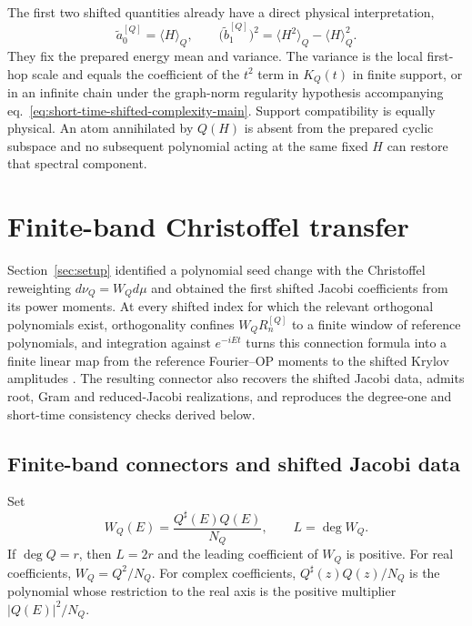 \documentclass[a4paper,11pt]{article}
\def\dd{d}%
\def\ii{i}%
\def\ee{e}%
\theoremstyle{definition}
\theoremstyle{remark}
\newcommand{\dd}{\mathrm d}
\newcommand{\ii}{\mathrm i}
\newcommand{\ee}{\mathrm e}
\newcommand{\Qsh}{Q^{\sharp}}
\begin{document}
The first two shifted quantities already have a direct physical interpretation,
\begin{equation}
 \widetilde a_0^{[Q]}=\langle H\rangle_Q,
 \qquad
 \bigl(\widetilde b_1^{[Q]}\bigr)^2
 =\langle H^2\rangle_Q-\langle H\rangle_Q^2.
\end{equation}
They fix the prepared energy mean and variance. The variance is the local first-hop scale and equals the coefficient of the $t^2$ term in $K_Q(t)$ in finite support, or in an infinite chain under the graph-norm regularity hypothesis accompanying eq.~\eqref{eq:short-time-shifted-complexity-main}. Support
compatibility is equally physical. An atom annihilated by $Q(H)$ is absent from the prepared
cyclic subspace and no subsequent polynomial acting at the same fixed $H$ can restore that
spectral component.

\section{Finite-band Christoffel transfer}
\label{sec:finiteband}

Section~\ref{sec:setup} identified a polynomial seed change with the Christoffel reweighting $\dd\nu_Q=W_Q\dd\mu$ and obtained the first shifted Jacobi coefficients from its power moments. At every shifted index for which the relevant orthogonal polynomials exist, orthogonality confines $W_QR_n^{[Q]}$ to a finite window of reference polynomials, and integration against $\ee^{-\ii Et}$ turns this connection formula into a finite linear map from the reference Fourier--OP moments to the shifted Krylov amplitudes \cite{Uvarov1969,KautskyGolub1983,BuenoMarcellan2004,NarayanHesthaven2012,GutlebOlverSlevinsky2024}. The resulting connector also recovers the shifted Jacobi data, admits root, Gram and reduced-Jacobi realizations, and reproduces the degree-one and short-time consistency checks derived below.

\subsection{Finite-band connectors and shifted Jacobi data}
\label{subsec:finite-band-connectors}
Set
\begin{equation}
   W_Q(E)=\frac{\Qsh(E)Q(E)}{N_Q},
   \qquad
   L=\deg W_Q.
   \label{eq:WQ-definition-main}
\end{equation}
If $\deg Q=r$, then $L=2r$ and the leading coefficient of $W_Q$ is positive. For real coefficients, $W_Q=Q^2/N_Q$. For complex coefficients, $\Qsh(z)Q(z)/N_Q$ is the polynomial whose restriction to the real axis is the positive multiplier $|Q(E)|^2/N_Q$.
\end{document}
